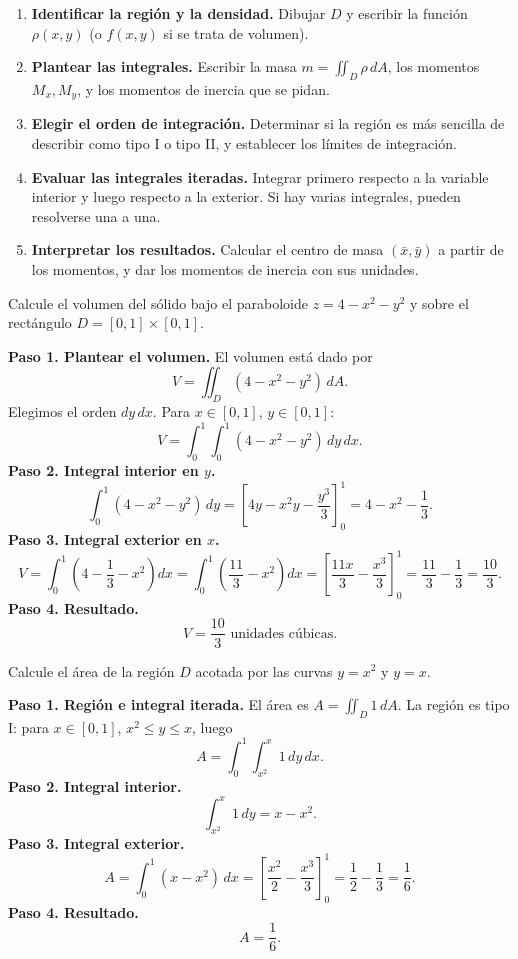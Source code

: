 \begin{pasos}
\begin{enumerate}
    \item \textbf{Identificar la región y la densidad.} Dibujar \(D\) y escribir la función \(\rho(x,y)\) (o \(f(x,y)\) si se trata de volumen).
    \item \textbf{Plantear las integrales.} Escribir la masa \(m=\iint_D \rho\,dA\), los momentos \(M_x, M_y\), y los momentos de inercia que se pidan.
    \item \textbf{Elegir el orden de integración.} Determinar si la región es más sencilla de describir como tipo I o tipo II, y establecer los límites de integración.
    \item \textbf{Evaluar las integrales iteradas.} Integrar primero respecto a la variable interior y luego respecto a la exterior. Si hay varias integrales, pueden resolverse una a una.
    \item \textbf{Interpretar los resultados.} Calcular el centro de masa \((\bar{x},\bar{y})\) a partir de los momentos, y dar los momentos de inercia con sus unidades.
\end{enumerate}
\end{pasos}

\begin{example}
Calcule el volumen del sólido bajo el paraboloide \(z=4-x^2-y^2\) y sobre el rectángulo \(D=[0,1]\times[0,1]\).
\begin{myproof}
\textbf{Paso 1. Plantear el volumen.} El volumen está dado por
\[
V=\iint_D (4-x^2-y^2)\,dA.
\]
Elegimos el orden \(dy\,dx\). Para \(x\in[0,1]\), \(y\in[0,1]\):
\[
V=\int_0^1\int_0^1 (4-x^2-y^2)\,dy\,dx.
\]
\textbf{Paso 2. Integral interior en $y$.}
\[
\int_0^1 (4-x^2-y^2)\,dy
= \left[4y-x^2 y-\frac{y^3}{3}\right]_0^1
= 4-x^2-\frac{1}{3}.
\]
\textbf{Paso 3. Integral exterior en $x$.}
\[
V=\int_0^1 \left(4-\frac{1}{3}-x^2\right)dx
= \int_0^1 \left(\frac{11}{3}-x^2\right)dx
= \left[\frac{11x}{3}-\frac{x^3}{3}\right]_0^1
= \frac{11}{3}-\frac{1}{3}=\frac{10}{3}.
\]
\textbf{Paso 4. Resultado.}
\[
\boxed{V=\frac{10}{3}\text{ unidades cúbicas.}}
\]
\end{myproof}
\end{example}

\begin{example}
Calcule el área de la región \(D\) acotada por las curvas \(y=x^2\) y \(y=x\).
\begin{myproof}
\textbf{Paso 1. Región e integral iterada.} El área es \(A=\iint_D 1\,dA\). La región es tipo I: para \(x\in[0,1]\), \(x^2\le y\le x\), luego
\[
A=\int_0^1\int_{x^2}^{x} 1\,dy\,dx.
\]
\textbf{Paso 2. Integral interior.}
\[
\int_{x^2}^{x} 1\,dy = x-x^2.
\]
\textbf{Paso 3. Integral exterior.}
\[
A=\int_0^1(x-x^2)\,dx = \left[\frac{x^2}{2}-\frac{x^3}{3}\right]_0^1 = \frac{1}{2}-\frac{1}{3}=\frac{1}{6}.
\]
\textbf{Paso 4. Resultado.}
\[
\boxed{A=\frac{1}{6}.}
\]
\end{myproof}
\end{example}

